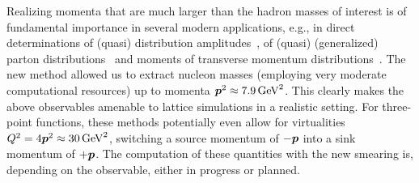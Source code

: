 Realizing momenta that are much larger than the hadron masses of
interest is of fundamental importance in several modern applications,
e.g., in direct determinations of (quasi) distribution
amplitudes~\cite{Aglietti:1998ur,Abada:2001if,Braun:2007wv},
of (quasi) (generalized) parton
distributions~\cite{Ji:2013dva,Ji:2015jwa,Lin:2014zya,Alexandrou:2015rja}
and moments of transverse momentum
distributions~\cite{Hagler:2009mb,Musch:2010ka,Musch:2011er,Engelhardt:2015xja}.
The new method allowed us to extract nucleon masses (employing very
moderate computational resources) up to momenta $\boldsymbol{p}^2\approx 7.9\,\textmd{GeV}^2$.
This clearly makes the above observables amenable to lattice simulations
in a realistic setting. For three-point functions, these methods
potentially even allow for virtualities
$Q^2=4\boldsymbol{p}^2\approx 30\,\textmd{GeV}^2$, switching a source momentum of
$-\boldsymbol{p}$ into a sink momentum of $+\boldsymbol{p}$.
The computation of these quantities with the new smearing
is, depending on the observable, either in progress or planned.\\
